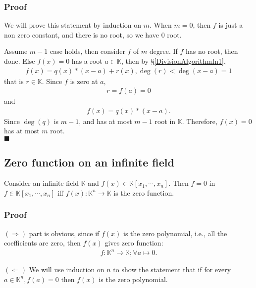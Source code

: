 \documentclass[11pt]{book}
\begin{document}
\subsubsection{Proof}
We will prove this statement by induction on $m$.
When $m=0$, then $f$ is just a non zero constant, and there is no root, so we have $0$ root.

Assume $m-1$ case holds, then consider $f$ of $m$ degree.
If $f$ has no root, then done.
Else $f(x)=0$ has a root $a \in \mathbb{K}$, then by \S\ref{DivisionAlgorithmIn1},
\begin{eqnarray}
f(x) = q(x)* (x-a) + r(x), \deg(r) < \deg(x-a)=1
\end{eqnarray}
that is $r \in \mathbb{K}$.
Since $f$ is zero at $a$,
\begin{eqnarray}
r = f(a) = 0
\end{eqnarray}
and
\begin{eqnarray}
f (x)= q(x)* (x-a).
\end{eqnarray}
Since $\deg(q)$ is $m-1$, and has at most $m-1$ root in $\mathbb{K}$.
Therefore, $f(x)=0$ has at most $m$ root.\\
$\blacksquare$

\subsection{Zero function on an infinite field}
Consider an infinite field $\mathbb{K}$ and $f(x) \in \mathbb{K}[x_1, \cdots, x_n]$.
Then $f = 0$ in $f \in \mathbb{K}[x_1, \cdots, x_n]$ iff $f(x) : \mathbb{K}^n \to \mathbb{K}$ is the zero function.

\subsubsection{Proof}
$(\Rightarrow)$ part is obvious, since if $f(x)$ is the zero polynomial, i.e., all the coefficients are zero, then $f(x)$ gives zero function:
\begin{eqnarray}
f : \mathbb{K}^n \to \mathbb{K}; \forall a \mapsto 0.
\end{eqnarray}

$(\Leftarrow)$ We will use induction on $n$ to show the statement that if for every $a \in \mathbb{K}^n, f(a) = 0$ then $f(x)$ is the zero polynomial.
\end{document}
